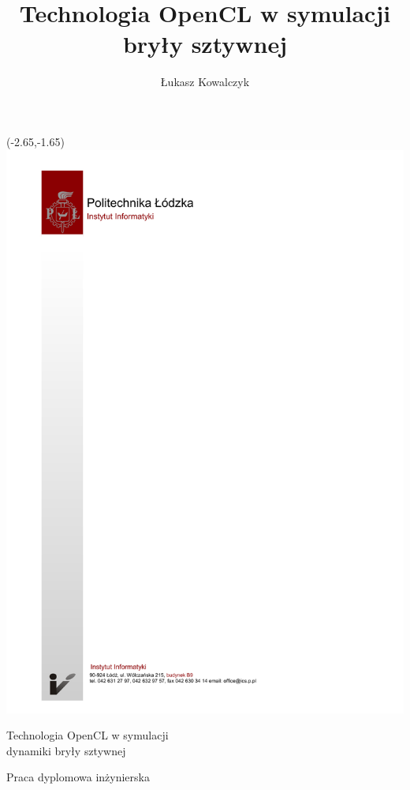 \documentclass[12pt, oneside, a4paper]{mwbk}
\begin{document}
\author{Łukasz Kowalczyk}
\title{Technologia OpenCL w symulacji bryły sztywnej}
\begin{titlepage}
\thispagestyle{empty}
\begin{textblock}{1}(-2.65,-1.65)
\includegraphics{figures/tytulowa_pusta_mgrinz.pdf}
\end{textblock}
\vspace{7.3cm}
\begin{center}
\selectfont
\Huge
Technologia OpenCL w symulacji \\
dynamiki bryły sztywnej
\end{center}
\begin{center}
\selectfont
Praca dyplomowa inżynierska
\end{center}
\vspace{7.9cm}
\begin{center}

\end{center}
\end{titlepage}
\end{document}
